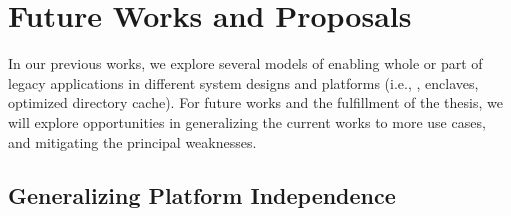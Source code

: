 \chapter{Future Works and Proposals}
\label{chap:future}




In our previous works, we explore several models of enabling
whole or part of legacy applications
in different system designs and platforms
(i.e., \liboses{}, \sgx{} enclaves, optimized directory cache).
For future works and the fulfillment of the thesis,
we will explore
opportunities in generalizing the current works to more use cases,
and mitigating the principal weaknesses.




\section{Generalizing Platform Independence}
\label{sec:future:independence}

